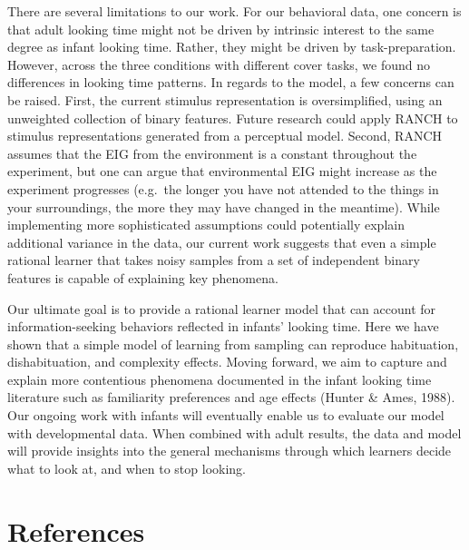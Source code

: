 \documentclass[10pt, letterpaper]{article}
\begin{document}
There are several limitations to our work. For our behavioral data, one
concern is that adult looking time might not be driven by intrinsic
interest to the same degree as infant looking time. Rather, they might
be driven by task-preparation. However, across the three conditions with
different cover tasks, we found no differences in looking time patterns.
In regards to the model, a few concerns can be raised. First, the
current stimulus representation is oversimplified, using an unweighted
collection of binary features. Future research could apply RANCH to
stimulus representations generated from a perceptual model. Second,
RANCH assumes that the EIG from the environment is a constant throughout
the experiment, but one can argue that environmental EIG might increase
as the experiment progresses (e.g.~the longer you have not attended to
the things in your surroundings, the more they may have changed in the
meantime). While implementing more sophisticated assumptions could
potentially explain additional variance in the data, our current work
suggests that even a simple rational learner that takes noisy samples
from a set of independent binary features is capable of explaining key
phenomena.

Our ultimate goal is to provide a rational learner model that can
account for information-seeking behaviors reflected in infants' looking
time. Here we have shown that a simple model of learning from sampling
can reproduce habituation, dishabituation, and complexity effects.
Moving forward, we aim to capture and explain more contentious phenomena
documented in the infant looking time literature such as familiarity
preferences and age effects (Hunter \& Ames, 1988). Our ongoing work
with infants will eventually enable us to evaluate our model with
developmental data. When combined with adult results, the data and model
will provide insights into the general mechanisms through which learners
decide what to look at, and when to stop looking.

\hypertarget{references}{%
\section{References}\label{references}}

\setlength{\parindent}{-0.1in} 
\setlength{\leftskip}{0.125in}

\noindent
\end{document}
